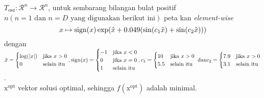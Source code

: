 $T_{\text{osz}}:\mathcal{R}^n\to \mathcal{R}^n$, untuk sembarang bilangan bulat positif $n(n=1 \text{ dan } n=D \text{ yang digunakan berikut ini})$ peta kan \textit{element-wise}\\
\[x\mapsto \operatorname{sign}(x) \exp(\hat{x}+0.049(\sin(c_1\hat{x})+\sin(c_2\hat{x})))\]
dengan $\hat{x}=\begin{cases}
  \log(\left|x\right|) & \text{jika } x > 0\\
  0 & \text{selain itu}
\end{cases}, \operatorname{sign}(x)=\begin{cases}
  -1 & \text{jika } x < 0\\
  0 & \text{jika } x = 0\\
  1 & \text{selain itu}
\end{cases},c_1=\begin{cases}
  10 & \text{jika } x > 0\\
  5.5 & \text{selain itu}
\end{cases}\text{ dan}\\ c_2=\begin{cases}
  7.9 & \text{jika } x > 0\\
  3.1 & \text{selain itu}
\end{cases}$.\\
$\mathrm{x}^{\text{opt}}$ vektor solusi optimal, sehingga $f(\mathrm{x}^{\text{opt}})$ adalah minimal.

